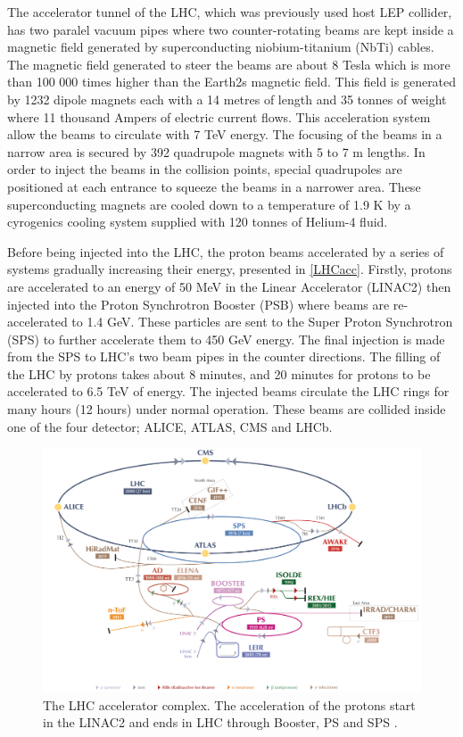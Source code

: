 The accelerator tunnel of the LHC, which was previously used host LEP collider, has two paralel vacuum pipes where two counter-rotating beams are kept inside a magnetic field generated by superconducting niobium-titanium (NbTi) cables. The magnetic field generated to steer the beams are about 8 Tesla which is more than 100 000 times higher than the Earth2s magnetic field. This field is generated by  1232 dipole magnets each with a 14 metres of length and 35 tonnes of weight where 11 thousand Ampers of electric current flows. This acceleration system allow the beams to circulate with 7 TeV energy. The focusing of the beams in a narrow area is secured by 392 quadrupole magnets with 5 to 7 m lengths. In order to inject the beams in the collision points, special quadrupoles are positioned at each entrance to squeeze the beams in a narrower area. These superconducting magnets are cooled down to a temperature of 1.9 K by a cyrogenics cooling system supplied with 120 tonnes of Helium-4 fluid.

Before being injected into the LHC, the proton beams accelerated by a series of systems gradually increasing their energy, presented in \autoref{LHCacc}. Firstly, protons are accelerated to an energy of 50 MeV in the Linear Accelerator (LINAC2) then injected into the Proton Synchrotron Booster (PSB) where beams are re-accelerated to 1.4 GeV. These particles are sent to the Super Proton Synchrotron (SPS) to further accelerate them to 450 GeV energy. The final injection is made from the SPS to LHC's two beam pipes in the counter directions. The filling of the LHC by protons takes about 8 minutes, and 20 minutes for protons to be accelerated to 6.5 TeV of energy. The injected beams circulate the LHC rings for many hours (12 hours) under normal operation. These beams are collided inside one of the four detector; ALICE, ATLAS, CMS and LHCb.

\begin{figure}[ht]
	\centering
	\includegraphics[width=\textwidth]{MSc_Thesis/fig/LHCacc.png}
	\vspace{2mm}
	\caption[The LHC accelerator complex. The acceleration of the protons start in the LINAC2 and ends in LHC through Booster, PS and SPS.]
	{The LHC accelerator complex. The acceleration of the protons start in the LINAC2 and ends in LHC through Booster, PS and SPS \cite{Mobs:2197559}.}
	\label{LHCacc}
\end{figure}